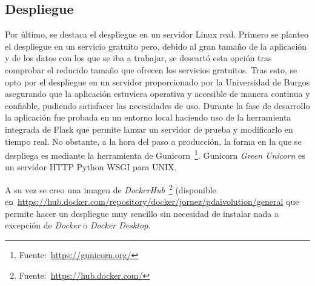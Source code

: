 \subsection{Despliegue}

Por último, se destaca el despliegue en un servidor Linux real.
Primero se planteo el despliegue en un servicio gratuito pero, debido al gran tamaño de la aplicación y de los datos con los que se iba a trabajar, se descartó esta opción tras comprobar el reducido tamaño que ofrecen los servicios gratuitos. Tras esto, se opto por el despliegue en un servidor proporcionado por la Universidad de Burgos asegurando que la aplicación estuviera operativa y accesible de manera continua y confiable, pudiendo satisfacer las necesidades de uso. 
Durante la fase de desarrollo la aplicación fue probada en un entorno local haciendo uso de la herramienta integrada de Flask que permite lanzar un servidor de prueba y modificarlo en tiempo real. No obstante, a la hora del paso a producción, la forma en la que se despliega es mediante la herramienta de Gunicorn~\footnote{Fuente:~\url{https://gunicorn.org/}}. Gunicorn \textit{Green Unicorn} es un servidor HTTP Python WSGI para UNIX.

A su vez se creo una imagen de \textit{DockerHub}~\footnote{Fuente:~\url{https://hub.docker.com/}} (disponible en~\url{https://hub.docker.com/repository/docker/jornez/pdaivolution/general} que permite hacer un despliegue muy sencillo sin necesidad de instalar nada a excepción de \textit{Docker} o \textit{Docker Desktop}.



